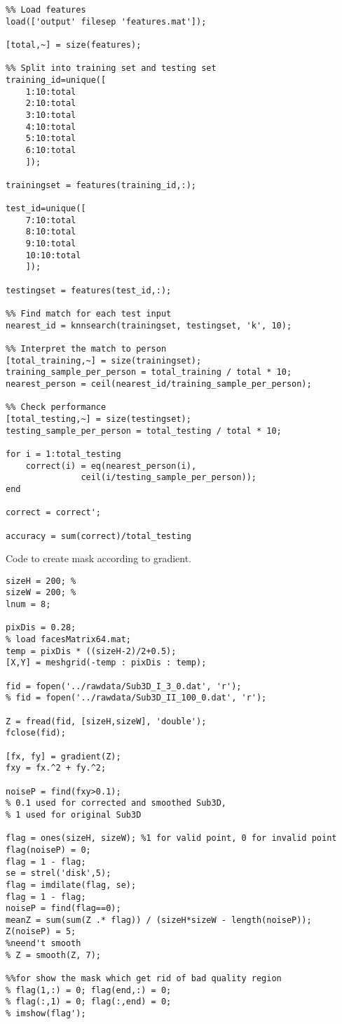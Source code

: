 \begin{verbatim}
%% Load features
load(['output' filesep 'features.mat']);

[total,~] = size(features);

%% Split into training set and testing set
training_id=unique([
    1:10:total
    2:10:total
    3:10:total
    4:10:total
    5:10:total
    6:10:total
    ]);

trainingset = features(training_id,:);

test_id=unique([
    7:10:total
    8:10:total
    9:10:total
    10:10:total
    ]);

testingset = features(test_id,:);

%% Find match for each test input
nearest_id = knnsearch(trainingset, testingset, 'k', 10);

%% Interpret the match to person
[total_training,~] = size(trainingset);
training_sample_per_person = total_training / total * 10;
nearest_person = ceil(nearest_id/training_sample_per_person);

%% Check performance
[total_testing,~] = size(testingset);
testing_sample_per_person = total_testing / total * 10;

for i = 1:total_testing
    correct(i) = eq(nearest_person(i),
	           ceil(i/testing_sample_per_person));
end

correct = correct';

accuracy = sum(correct)/total_testing
\end{verbatim}
\clearpage

Code to create mask according to gradient.

\begin{verbatim}
sizeH = 200; %
sizeW = 200; %
lnum = 8;

pixDis = 0.28;
% load facesMatrix64.mat;
temp = pixDis * ((sizeH-2)/2+0.5);
[X,Y] = meshgrid(-temp : pixDis : temp);

fid = fopen('../rawdata/Sub3D_I_3_0.dat', 'r');
% fid = fopen('../rawdata/Sub3D_II_100_0.dat', 'r');

Z = fread(fid, [sizeH,sizeW], 'double');
fclose(fid);

[fx, fy] = gradient(Z);
fxy = fx.^2 + fy.^2;

noiseP = find(fxy>0.1);
% 0.1 used for corrected and smoothed Sub3D,
% 1 used for original Sub3D

flag = ones(sizeH, sizeW); %1 for valid point, 0 for invalid point
flag(noiseP) = 0;
flag = 1 - flag;
se = strel('disk',5);  
flag = imdilate(flag, se);
flag = 1 - flag;
noiseP = find(flag==0);
meanZ = sum(sum(Z .* flag)) / (sizeH*sizeW - length(noiseP));
Z(noiseP) = 5;
%neend't smooth
% Z = smooth(Z, 7);

%%for show the mask which get rid of bad quality region
% flag(1,:) = 0; flag(end,:) = 0;
% flag(:,1) = 0; flag(:,end) = 0;
% imshow(flag');
\end{verbatim}
\clearpage

